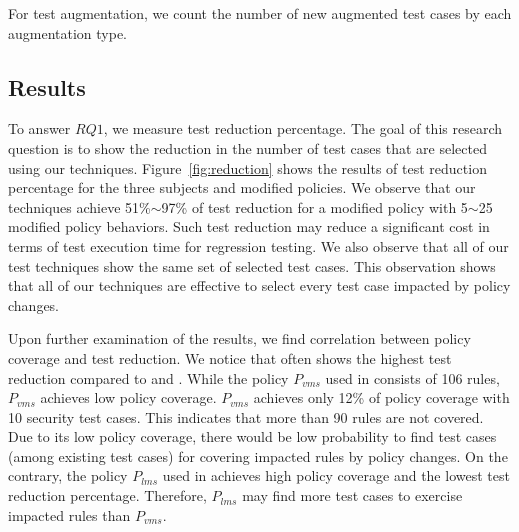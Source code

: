 For test augmentation,
we count the number of new augmented test cases by each augmentation type.

\subsection{Results}
To answer $RQ1$, 
we measure test reduction percentage.
The goal of this research question is to show the reduction in the number of test cases that
are selected using our techniques.
Figure~\ref{fig:reduction} shows the results of test reduction percentage for the three subjects and modified policies.
We observe that our techniques achieve 51\%$\sim$97\% of test reduction for a modified policy with 5$\sim$25 modified policy behaviors.
Such test reduction may reduce a significant cost in terms of test execution time
for regression testing. We also observe that all of our test techniques show the same
set of selected test cases. This observation shows that all of our techniques are
effective to select every test case impacted by policy changes.

Upon further examination
of the results, we find correlation between policy coverage and test reduction.
We notice that  often shows the highest test reduction compared to  and .
While the policy $P_{vms}$ used in  consists of 106 rules, $P_{vms}$ achieves low policy coverage.
$P_{vms}$ achieves only 12\% of policy coverage with 10 security test cases.
This indicates that more than 90 rules are not covered. Due to its low policy coverage, there would be low probability
to find test cases (among existing test cases) for covering impacted rules by policy changes.
On the contrary, the policy $P_{lms}$ used in  achieves high policy coverage and the lowest
test reduction percentage. Therefore, $P_{lms}$ may find more test
cases to exercise impacted rules than $P_{vms}$. 

 





